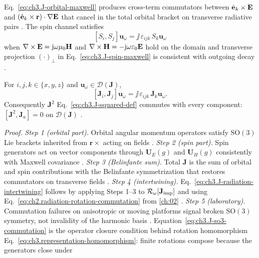 Eq.~\eqref{eq:ch3.J-orbital-maxwell} produces cross-term commutators between \(\hat{\mathbf{e}}_k\times\mathbf{E}\)
and \((\hat{\mathbf{e}}_k\times\mathbf{r})\cdot\nabla\mathbf{E}\) that cancel in the total orbital bracket on
transverse radiative pairs \cite{hansen1988}. The spin channel satisfies
\begin{equation}
\label{eq:ch3.S-commutation-pair}
[S_i,S_j]\mathbf{u}_\omega
=
\jj\,\varepsilon_{ijk}\,S_k\mathbf{u}_\omega
\end{equation}
when \(\nabla\times\mathbf{E}=\mathrm{j}\omega\mu_0\mathbf{H}\) and \(\nabla\times\mathbf{H}=-\mathrm{j}\omega\varepsilon_0\mathbf{E}\) hold on the domain
and transverse projection \((\cdot)_{\perp}\) in Eq.~\eqref{eq:ch3.J-spin-maxwell} is consistent with
outgoing decay \cite{belinfante1940}.
\begin{theorem}
\label{thm:ch3.J-so3-commutation}
For \(i,j,k\in\{x,y,z\}\) and \(\mathbf{u}_\omega\in\mathcal{D}(\mathbf{J})\),
\begin{equation}
\label{eq:ch3.J-so3-commutation}
[\mathbf{J}_{i},\mathbf{J}_{j}]\mathbf{u}_\omega
=
\jj\,\varepsilon_{ijk}\,\mathbf{J}_{k}\mathbf{u}_\omega.
\end{equation}
Consequently \(\mathbf{J}^{2}\) Eq.~\eqref{eq:ch3.J-squared-def} commutes with every component:
\([\mathbf{J}^{2},\mathbf{J}_{a}]=0\) on \(\mathcal{D}(\mathbf{J})\) \cite{jackson1999}.
\end{theorem}
\noindent\textit{Proof.}
\emph{Step 1 (orbital part).} Orbital angular momentum operators satisfy \(\mathrm{SO}(3)\) Lie brackets inherited from \(\mathbf{r}\times\) acting on fields .
\emph{Step 2 (spin part).} Spin generators act on vector components through \(\mathbf{U}_E(g)\) and \(\mathbf{U}_H(g)\) consistently with Maxwell covariance .
\emph{Step 3 (Belinfante sum).} Total \(\mathbf{J}\) is the sum of orbital and spin contributions with the Belinfante symmetrization that restores commutators on transverse fields .
\emph{Step 4 (intertwining).} Eq.~\eqref{eq:ch3.J-radiation-intertwining} follows by applying Steps 1--3 to \(\mathcal{R}_\omega[\mathbf{J}_{\mathrm{imp}}]\) and using Eq.~\eqref{eq:ch2.radiation-rotation-commutation} from \ref{ch:02} .
\emph{Step 5 (laboratory).} Commutation failures on anisotropic or moving platforms signal broken \(\mathrm{SO}(3)\) symmetry, not invalidity of the harmonic basis .
Equation~\eqref{eq:ch3.J-so3-commutation} is the operator closure condition behind rotation homomorphism
Eq.~\eqref{eq:ch3.representation-homomorphism}: finite rotations compose because the generators close under
